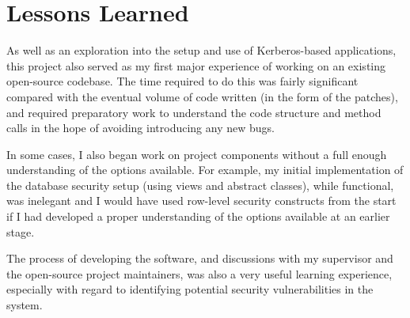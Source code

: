 \documentclass[12pt]{report}
\begin{document}
\section{Lessons Learned}
As well as an exploration into the setup and use of Kerberos-based applications, this project also served as my first major experience of working on an existing open-source codebase. The time required to do this was fairly significant compared with the eventual volume of code written (in the form of the patches), and required preparatory work to understand the code structure and method calls in the hope of avoiding introducing any new bugs.

In some cases, I also began work on project components without a full enough understanding of the options available. For example, my initial implementation of the database security setup (using views and abstract classes), while functional, was inelegant and I would have used row-level security constructs from the start if I had developed a proper understanding of the options available at an earlier stage.

The process of developing the software, and discussions with my supervisor and the open-source project maintainers, was also a very useful learning experience, especially with regard to identifying potential security vulnerabilities in the system.
\end{document}
